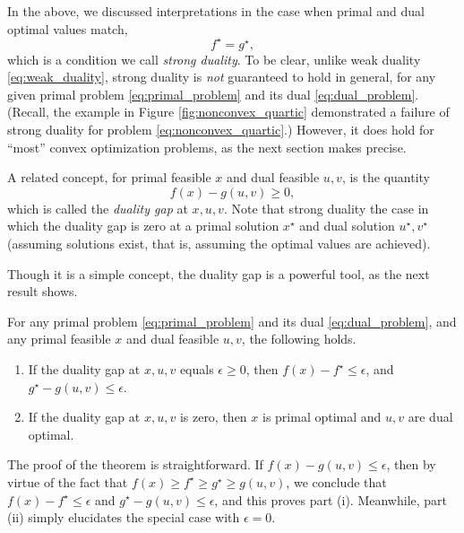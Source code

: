 In the above, we discussed interpretations in the case when primal and dual 
optimal values match,       
\begin{equation}
\label{eq:strong_duality}
f^\star = g^\star,
\end{equation}
which is a condition we call \emph{strong duality}. To be clear, unlike weak
duality \eqref{eq:weak_duality}, strong duality is \emph{not} guaranteed to hold
in general, for any given primal problem \eqref{eq:primal_problem} and its dual  
\eqref{eq:dual_problem}. (Recall, the example in Figure
\ref{fig:nonconvex_quartic} demonstrated a failure of strong duality for problem
\eqref{eq:nonconvex_quartic}.) However, it does hold for ``most'' convex
optimization problems, as the next section makes precise. 

A related concept, for primal feasible $x$ and dual feasible $u,v$, is the
quantity  
\begin{equation}
\label{eq:duality_gap}
f(x) - g(u,v) \geq 0,
\end{equation}
which is called the \emph{duality gap} at $x,u,v$. Note that strong duality the
case in which the duality gap is zero at a primal solution $x^\star$ and dual
solution $u^\star, v^\star$ (assuming solutions exist, that is, assuming the
optimal values are achieved).  

Though it is a simple concept, the duality gap is a powerful tool, as the next
result shows.

\begin{Theorem}
\label{thm:duality_gap}
For any primal problem \eqref{eq:primal_problem} and its dual
\eqref{eq:dual_problem}, and any primal feasible $x$ and dual feasible $u,v$,  
the following holds.  

\begin{enumerate}[label=(\roman*)]
\item If the duality gap at $x,u,v$ equals $\epsilon \geq 0$, then $f(x) -
  f^\star \leq \epsilon$, and $g^\star - g(u,v) \leq \epsilon$.  

\item If the duality gap at $x,u,v$ is zero, then $x$ is primal optimal and
  $u,v$ are dual optimal. 
\end{enumerate}
\end{Theorem}

The proof of the theorem is straightforward. If $f(x) - g(u,v) \leq \epsilon$, 
then by virtue of the fact that $f(x) \geq f^\star \geq g^\star \geq g(u,v)$, we
conclude that $f(x) - f^\star \leq \epsilon$ and $g^\star - g(u,v) \leq
\epsilon$, and this proves part (i). Meanwhile, part (ii) simply elucidates the  
special case with $\epsilon = 0$.

